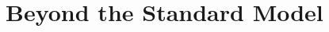 \ifx\master\undefined\fi

\chapter{Beyond the Standard Model}
\label{ch:theory}

\ifx\master\undefined\fi
